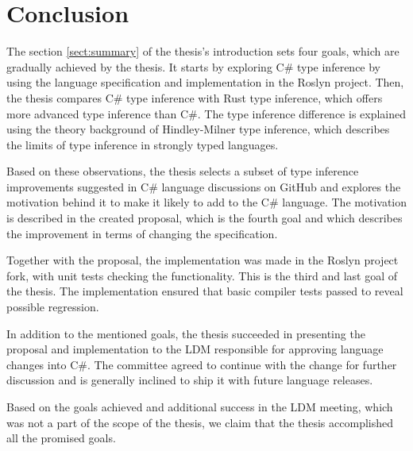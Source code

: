 \chapter*{Conclusion}

The section \ref{sect:summary} of the thesis's introduction sets four goals, which are gradually achieved by the thesis. 
It starts by exploring C\# type inference by using the language specification and implementation in the Roslyn project. 
Then, the thesis compares C\# type inference with Rust type inference, which offers more advanced type inference than C\#. 
The type inference difference is explained using the theory background of Hindley-Milner type inference, which describes the limits of type inference in strongly typed languages.
\par
Based on these observations, the thesis selects a subset of type inference improvements suggested in C\# language discussions on GitHub and explores the motivation behind it to make it likely to add to the C\# language. 
The motivation is described in the created proposal, which is the fourth goal and which describes the improvement in terms of changing the specification.
\par
Together with the proposal, the implementation was made in the Roslyn project fork, with unit tests checking the functionality. 
This is the third and last goal of the thesis. 
The implementation ensured that basic compiler tests passed to reveal possible regression.
\par
In addition to the mentioned goals, the thesis succeeded in presenting the proposal and implementation to the LDM responsible for approving language changes into C\#. 
The committee agreed to continue with the change for further discussion and is generally inclined to ship it with future language releases.
\par
Based on the goals achieved and additional success in the LDM meeting, which was not a part of the scope of the thesis, we claim that the thesis accomplished all the promised goals.

